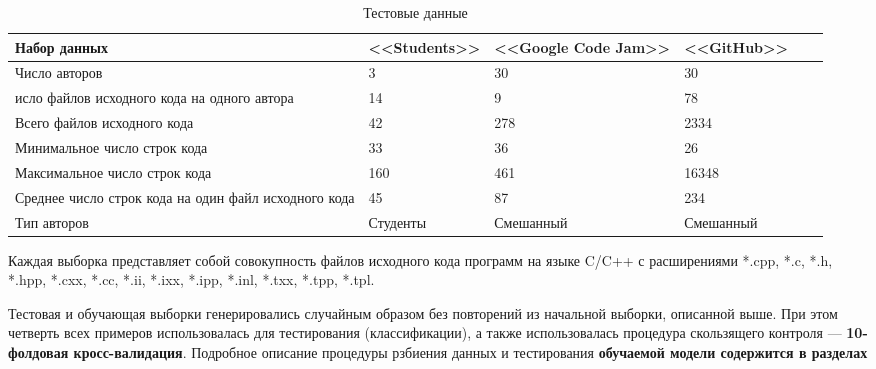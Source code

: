\begin{table}[h!]
\caption{ Тестовые данные }
\label{tab:data}
\begin{center}
\begin{tabularx}{\linewidth}{|X|X|X|X|X|X|}
\hline
Набор данных & <<Students>> & <<Google Code Jam>> & <<GitHub>> \\
\hline
Число авторов & 3 & 30 & 30 \\
\hline
исло файлов исходного кода на одного автора & 14 & 9 & 78 \\
\hline
Всего файлов исходного кода & 42 & 278 & 2334 \\
\hline
Минимальное число строк кода & 33 & 36 & 26 \\
\hline
Максимальное число строк кода & 160 & 461 & 16348 \\
\hline
Среднее число строк кода на один файл исходного кода & 45 & 87 & 234 \\
\hline
Тип авторов & Студенты & Смешанный & Смешанный \\
\hline
\end{tabularx}
\end{center}
\end{table}


Каждая выборка представляет собой совокупность файлов исходного кода программ на языке C/C++ с расширениями
*.cpp, *.c, *.h, *.hpp, *.cxx, *.cc, *.ii, *.ixx, *.ipp, *.inl, *.txx, *.tpp, *.tpl.

Тестовая и обучающая выборки генерировались случайным образом без повторений из начальной выборки, 
описанной выше. При этом четверть всех примеров использовалась для тестирования (классификации), а также
использовалась процедура скользящего контроля --- \textbf{10-фолдовая кросс-валидация}. Подробное описание процедуры рзбиения данных
и тестирования \textbf{ обучаемой модели содержится в разделах}



